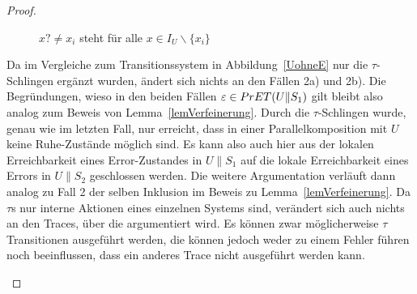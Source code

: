 \begin{proof}
\begin{itemize}
\begin{figure} [h!tbp]
\begin{center}
        \caption{$x?\neq x_i$ steht für alle $x\in I_U\backslash\{x_i\}$}
\label{UohneEmitTau}
      \end{center}
      \end{figure}
      Da im Vergleiche zum Transitionssystem in Abbildung~\ref{UohneE} nur die
      $\tau$-Schlingen ergänzt wurden, ändert sich nichts an den Fällen 2a) und
      2b). Die Begründungen, wieso in den beiden Fällen $\varepsilon\in
      PrET{}(U\|S_1)$ gilt bleibt also analog zum Beweis von
      Lemma~\ref{lemVerfeinerung}. Durch die $\tau$-Schlingen wurde, genau wie
      im letzten Fall, nur erreicht, dass in einer Parallelkomposition mit $U$
      keine Ruhe-Zustände möglich sind. Es kann also auch hier aus der lokalen
      Erreichbarkeit eines Error-Zustandes in $U\|S_1$ auf die lokale
      Erreichbarkeit eines Errors in $U\|S_2$ geschlossen werden. Die weitere
      Argumentation verläuft dann analog zu Fall 2 der selben Inklusion im
      Beweis zu Lemma~\ref{lemVerfeinerung}. Da $\tau$s nur interne Aktionen
      eines einzelnen Systems sind, verändert sich auch nichts an den Traces,
      über die argumentiert wird. Es können zwar möglicherweise $\tau$
      Transitionen ausgeführt werden, die können jedoch weder zu einem Fehler
      führen noch beeinflussen, dass ein anderes Trace nicht ausgeführt werden
      kann.
  \end{itemize}


\end{proof}
